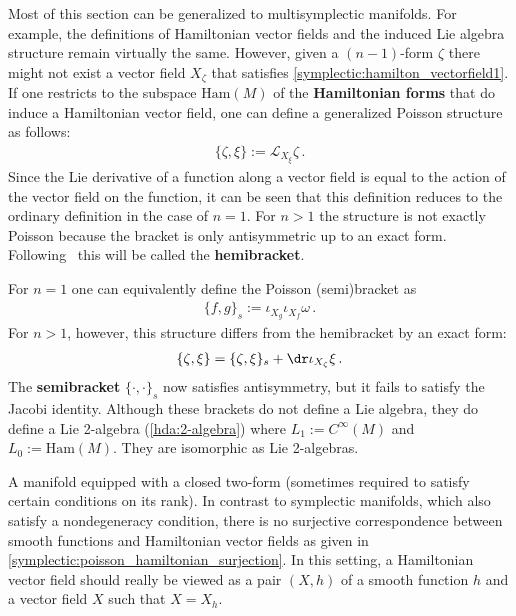     \begin{remark}\label{symplectic:hamiltonian_forms}
        Most of this section can be generalized to multisymplectic manifolds. For example, the definitions of Hamiltonian vector fields and the induced Lie algebra structure remain virtually the same. However, given a $(n-1)$-form $\zeta$ there might not exist a vector field $X_\zeta$ that satisfies \cref{symplectic:hamilton_vectorfield1}. If one restricts to the subspace $\mathrm{Ham}(M)$ of the \textbf{Hamiltonian forms} that do induce a Hamiltonian vector field, one can define a generalized Poisson structure as follows:
        \begin{gather}
            \{\zeta,\xi\} := \mathcal{L}_{X_\xi}\zeta\,.
        \end{gather}
        Since the Lie derivative of a function along a vector field is equal to the action of the vector field on the function, it can be seen that this definition reduces to the ordinary definition in the case of $n=1$. For $n>1$ the structure is not exactly Poisson because the bracket is only antisymmetric up to an exact form. Following~\citet{baez_categorified_2010} this will be called the \textbf{hemibracket}.

        For $n=1$ one can equivalently define the Poisson (semi)bracket as
        \begin{gather}
            \{f,g\}_s := \iota_{X_g}\iota_{X_f}\omega\,.
        \end{gather}
        For $n>1$, however, this structure differs from the hemibracket by an exact form:
        \begin{gather}
            \{\zeta,\xi\} = \{\zeta,\xi\}_s + \dr\iota_{X_\zeta}\xi\,.
        \end{gather}
        The \textbf{semibracket} $\{\cdot,\cdot\}_s$ now satisfies antisymmetry, but it fails to satisfy the Jacobi identity. Although these brackets do not define a Lie algebra, they do define a Lie 2-algebra (\cref{hda:2-algebra}) where $L_1:=C^\infty(M)$ and $L_0:=\mathrm{Ham}(M)$. They are isomorphic as Lie 2-algebras.
    \end{remark}

    \begin{remark}
        A manifold equipped with a closed two-form (sometimes required to satisfy certain conditions on its rank). In contrast to symplectic manifolds, which also satisfy a nondegeneracy condition, there is no surjective correspondence between smooth functions and Hamiltonian vector fields as given in \cref{symplectic:poisson_hamiltonian_surjection}. In this setting, a Hamiltonian vector field should really be viewed as a pair $(X,h)$ of a smooth function $h$ and a vector field $X$ such that $X=X_h$.
    \end{remark}

